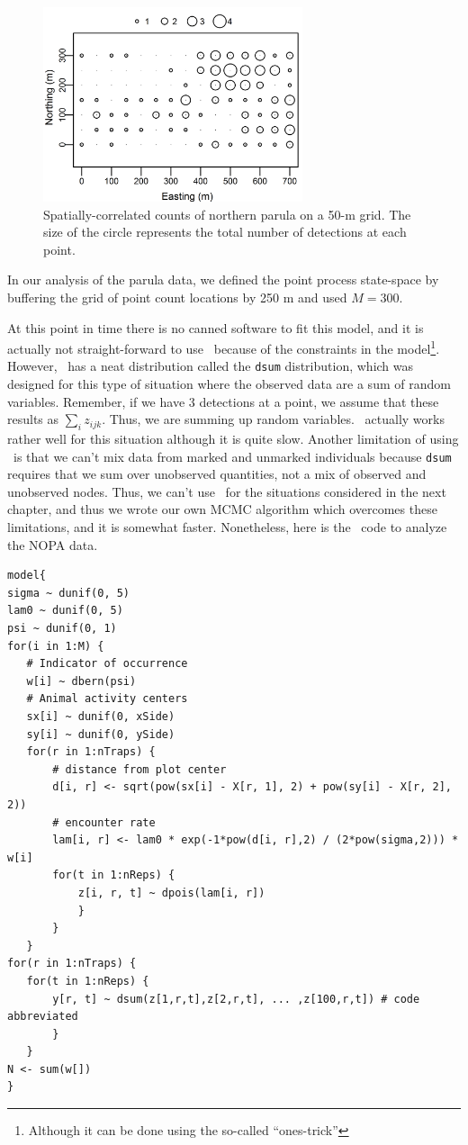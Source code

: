 \begin{figure}
  \centering
  \includegraphics[width=3in,height=2.25in]{Ch18-Unmarked/figs/nopa}
  \caption{Spatially-correlated counts of northern parula on a 50-m
    grid. The size of the circle represents the total number of
    detections at each point.}
  \label{fig:nopaDat}
\end{figure}



In our analysis of the parula data, we defined the point process
state-space by buffering the grid of point
count locations by 250 m and used $M=300$.

At this point in time there is no canned software to fit this model,
and it is actually not straight-forward to use \bugs~because of the
constraints in the model\footnote{Although it can be done using the
  so-called ``ones-trick''}. However, \jags~has a neat distribution
called the \verb+dsum+ distribution, which was designed for this type
of situation where the observed data are a sum of random
variables. Remember, if we have 3 detections at a point, we assume
that these results as $\sum_i z_{ijk}$. Thus, we are summing up random
variables. \jags~actually works rather well for this situation
although it is quite slow. Another limitation of using \jags~is that
we can't mix data from marked and unmarked individuals because
\verb+dsum+ requires that we sum over unobserved quantities, not a mix
of observed and unobserved nodes. Thus, we can't use \jags~for the
situations considered in the next chapter, and thus we wrote our own
MCMC algorithm which overcomes these limitations, and it is somewhat
faster. Nonetheless, here is the \jags~code to analyze the NOPA data.

\begin{small}
\begin{verbatim}
model{
sigma ~ dunif(0, 5)
lam0 ~ dunif(0, 5)
psi ~ dunif(0, 1)
for(i in 1:M) {
   # Indicator of occurrence
   w[i] ~ dbern(psi)
   # Animal activity centers
   sx[i] ~ dunif(0, xSide)
   sy[i] ~ dunif(0, ySide)
   for(r in 1:nTraps) {
       # distance from plot center
       d[i, r] <- sqrt(pow(sx[i] - X[r, 1], 2) + pow(sy[i] - X[r, 2], 2))
       # encounter rate
       lam[i, r] <- lam0 * exp(-1*pow(d[i, r],2) / (2*pow(sigma,2))) * w[i]
       for(t in 1:nReps) {
           z[i, r, t] ~ dpois(lam[i, r])
           }
       }
   }
for(r in 1:nTraps) {
   for(t in 1:nReps) {
       y[r, t] ~ dsum(z[1,r,t],z[2,r,t], ... ,z[100,r,t]) # code abbreviated
       }
   }
N <- sum(w[])
}
\end{verbatim}
\end{small}

